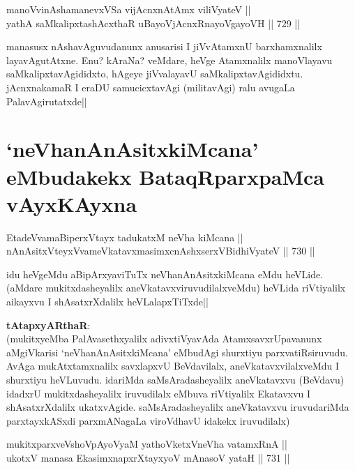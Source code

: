 \begin{shl}
manoVvinAshamanevxVSa vijAcnxnAtAmx viliVyateV || \\
yathA saMkalipxtashAcxthaR uBayoVjAcnxRnayoVgayoVH ||  729 ||  
\end{shl}

\begin{artha} 
manasusx nAshavAguvudanunx anusarisi I jiVvAtamxnU barxhamxnalilx 
layavAgutAtxne. Enu? kAraNa? veMdare, heVge Atamxnalilx manoVlayavu 
saMkalipxtavAgididxto, hAgeye jiVvalayavU saMkalipxtavAgididxtu. 
jAcnxnakamaR I eraDU samucicxtavAgi (militavAgi) ralu avugaLa 
PalavAgirutatxde|| 
\end{artha}

\section*{`neVhanAnAsitxkiMcana' eMbudakekx BataqRparxpaMca vAyxKAyxna}


\begin{shl}
EtadeVvamaBiperxVtayx tadukatxM neVha kiMcana || \\
nAnA\s sitxVteyxVvameVkatavxmasimxcnAshxserxV\s BidhiVyateV ||  730 ||  
\end{shl}

\begin{artha} 
idu heVgeMdu aBipArxyaviTuTx neVhanAnAsitxkiMcana eMdu heVLide. 
(aMdare mukitxdasheyalilx aneVkatavxviruvudilalxveMdu) heVLida 
riVtiyalilx aikayxvu I shAsatxrXdalilx heVLalapxTiTxde||
\end{artha}


\textbf{tAtapxyARthaR}:\\
(mukitxyeMba PalAvasethxyalilx adivxtiVyavAda 
AtamxsavxrUpavanunx 
aMgiVkarisi `neVhanAnAsitxkiMcana' eMbudAgi shurxtiyu 
parxvatiRsiruvudu. AvAga mukAtxtamxnalilx savxlapxvU BeVdavilalx, 
aneVkatavxvilalxveMdu I shurxtiyu heVLuvudu. idariMda 
saMsAradasheyalilx aneVkatavxvu (BeVdavu) idadxrU mukitxdasheyalilx 
iruvudilalx eMbuva riVtiyalilx Ekatavxvu I shAsatxrXdalilx 
ukatxvAgide. saMsAradasheyalilx aneVkatavxvu iruvudariMda 
parxtayxkASxdi parxmANagaLa viroVdhavU idakekx iruvudilalx)
	

\begin{shl}
mukitxparxveVshoVpAyoV\s yaM yathoVketxVneVha vatamxRnA || \\
ukotxV manasa EkasimxnapxrXtayxyoV mAnasoV yataH ||  731 ||  
\end{shl}

